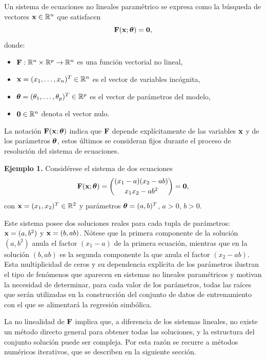 Un sistema de ecuaciones no lineales paramétrico se expresa como la búsqueda de vectores \(\mathbf{x} \in \mathbb{R}^n\) que satisfacen
\begin{equation}
\mathbf{F}(\mathbf{x}; \boldsymbol{\theta}) = \mathbf{0}, \label{eq:sistema_general}
\end{equation}
donde:
\begin{itemize}
    \item \(\mathbf{F}: \mathbb{R}^n \times \mathbb{R}^p \to \mathbb{R}^n\) es una función vectorial no lineal,
    \item \(\mathbf{x} = (x_1, \dots, x_n)^T \in \mathbb{R}^n\) es el vector de variables incógnita,
    \item \(\boldsymbol{\theta} = (\theta_1, \dots, \theta_p)^T \in \mathbb{R}^p\) es el vector de parámetros del modelo,
    \item \(\mathbf{0} \in \mathbb{R}^n\) denota el vector nulo.
\end{itemize}
La notación \(\mathbf{F}(\mathbf{x}; \boldsymbol{\theta})\) indica que \(\mathbf{F}\) depende explícitamente de las variables \(\mathbf{x}\) y de los parámetros
\(\boldsymbol{\theta}\), estos últimos se consideran fijos durante el proceso de
resolución del sistema de ecuaciones.

\noindent\textbf{Ejemplo 1.} Considérese el sistema de dos ecuaciones
\[
\mathbf{F}(\mathbf{x}; \boldsymbol{\theta}) =
\begin{pmatrix}
(x_1 - a)(x_2 - ab) \\[2pt] x_1 x_2 - a b^2
\end{pmatrix}
= \mathbf{0},
\]
con \(\mathbf{x} = (x_1, x_2)^T \in \mathbb{R}^2\) y parámetros
\(\boldsymbol{\theta} = (a, b)^T\), \(a > 0\), \(b > 0\).

Este sistema posee dos soluciones reales para cada tupla de parámetros: \(\mathbf{x} = (a, b^2)\) y \(\mathbf{x} = (b, ab)\). Nótese que la primera componente de la solución \((a, b^2)\) anula el factor
\((x_1 - a)\) de la primera ecuación, mientras que en la solución
\((b, ab)\) es la segunda componente la que anula el factor
\((x_2 - ab)\). Esta multiplicidad de ceros y su dependencia explícita
de los parámetros ilustran el tipo de fenómenos que aparecen en sistemas no lineales paramétricos y motivan la necesidad de determinar, para cada valor de los parámetros, todas las raíces que serán utilizadas en la construcción del conjunto de datos de entrenamiento con el que se alimentará la regresión simbólica.

La no linealidad de \(\mathbf{F}\) implica que, a diferencia de los sistemas lineales, no existe un método directo general para obtener todas las soluciones, y la estructura del conjunto solución puede ser compleja. Por esta razón se recurre a métodos numéricos iterativos, que se describen en la siguiente sección.

